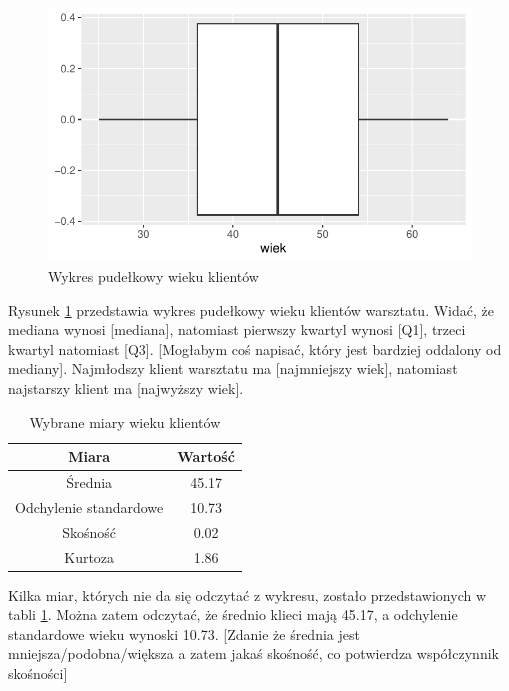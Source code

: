 \documentclass{article}\usepackage[]{graphicx}\usepackage[]{xcolor}
\makeatletter
\def\maxwidth{ %
  \ifdim\Gin@nat@width>\linewidth
    \linewidth
  \else
    \Gin@nat@width
  \fi
}
\newenvironment{knitrout}{}{} %
\makeatother
\begin{document}
\begin{knitrout}
\color{fgcolor}\begin{figure}

{\centering \includegraphics[width=\maxwidth]{figure/fig_wiek-1} 

}

\caption[Wykres pudełkowy wieku klientów]{Wykres pudełkowy wieku klientów}\label{fig:fig_wiek}
\end{figure}

\end{knitrout}

Rysunek \ref{fig:fig_wiek} przedstawia wykres pudełkowy wieku klientów warsztatu. Widać, że mediana wynosi [mediana], natomiast pierwszy kwartyl wynosi {\color{red}[Q1]}, trzeci kwartyl natomiast {\color{red}[Q3]}. {\color{red}[Mogłabym coś napisać, który jest bardziej oddalony od mediany]}. Najmłodszy klient warsztatu ma {\color{red}[najmniejszy wiek]}, natomiast najstarszy klient ma {\color{red}[najwyższy wiek]}.

\begin{table}[H]
\centering
\begin{tabular}{c|c} \hline
Miara & Wartość \\ \hline
Średnia & 45.17 \\ 
Odchylenie standardowe & 10.73 \\
Skośność & 0.02  \\ 
Kurtoza & 1.86 \\ \hline
\end{tabular}
\caption{Wybrane miary wieku klientów}
\label{tab_wiek}
\end{table}

Kilka miar, których nie da się odczytać z wykresu, zostało przedstawionych w tabli \ref{tab_wiek}. Można zatem odczytać, że średnio klieci mają 45.17, a odchylenie standardowe wieku wynoski 10.73. {\color{red}[Zdanie że średnia jest mniejsza/podobna/większa a zatem jakaś skośność, co potwierdza współczynnik skośności]}
\end{document}
